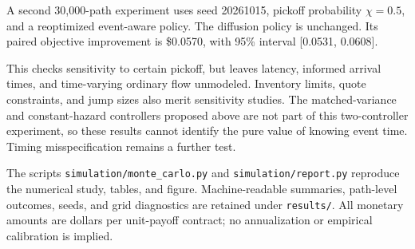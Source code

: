 A second 30,000-path experiment uses seed 20261015, pickoff probability
$\chi=0.5$, and a reoptimized event-aware policy. The diffusion policy is
unchanged. Its paired objective improvement is
\$0.0570, with 95\% interval [0.0531, 0.0608].

This checks sensitivity to certain pickoff, but leaves latency, informed
arrival times, and time-varying ordinary flow unmodeled. Inventory limits,
quote constraints, and jump sizes also merit sensitivity studies. The
matched-variance and constant-hazard controllers proposed above are not part
of this two-controller experiment, so these results cannot identify the pure
value of knowing event time. Timing misspecification remains a further test.

The scripts \texttt{simulation/monte\_carlo.py} and
\texttt{simulation/report.py} reproduce the numerical study, tables, and figure.
Machine-readable summaries, path-level outcomes, seeds, and grid diagnostics
are retained under \texttt{results/}. All monetary amounts are dollars per
unit-payoff contract; no annualization or empirical calibration is implied.
